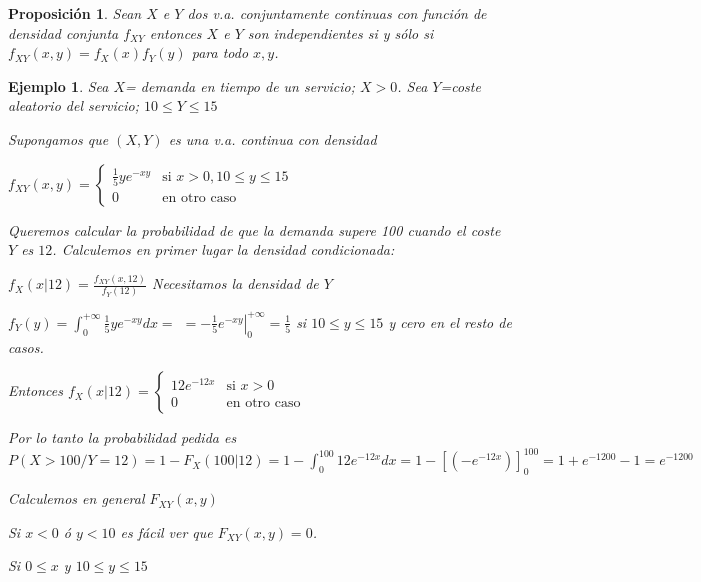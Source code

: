 \documentclass[12pt]{report}
\newtheorem{proposition}[definition]{Proposici\'on}
\newtheorem{example}[definition]{Ejemplo}
\begin{document}
    \begin{proposition}
    Sean $X$ e $Y$ dos v.a. conjuntamente continuas con función de densidad conjunta
    $f_{XY}$ entonces  $X$ e $Y$ son independientes si y sólo si $f_{X Y}(x,y)=f_{X}(x)
    f_Y(y)$ para todo $x,y$.
    \end{proposition}




\begin{example}

    Sea $X$= demanda en tiempo de un servicio; $X>0$. Sea $Y$=coste aleatorio
    del servicio; $10\leq Y\leq 15$

    Supongamos que $(X,Y)$ es una v.a. continua con densidad

    $f_{XY}(x,y)=\left\{\begin{array}{ll} \frac{1}{5} y e^{-xy} &
    \mbox{si } x>0, 10\leq y\leq 15\\
    0 & \mbox{en otro caso}\end{array}\right.$

    Queremos calcular la probabilidad de que la demanda supere 100
     cuando el coste $Y$ es $12$.
    Calculemos en primer lugar la densidad condicionada:

    $f_{X}(x|12)=\frac{f_{XY}(x,12)}{f_{Y}(12)}$
    Necesitamos la densidad de $Y$

    $f_{Y}(y)=\int_{0}^{+\infty} \frac{1}{5} y e^{-xy}
    dx=$\newline
$=\left.-\frac{1}{5}e^{-xy}\right|_{0}^{+\infty}=\frac{1}{5}$
    si $10\leq y\leq 15$ y cero en el resto de casos.

    Entonces $f_{X}(x|12)=\left\{\begin{array}{ll} 12 e^{-12x} &
    \mbox{si } x>0\\
    0 & \mbox{en otro caso}\end{array}\right.$

    Por lo tanto la probabilidad pedida es \newline
    $P(X>100/Y=12)=1-F_{X}(100|12)=
    1-\int_{0}^{100} 12 e^{-12x} dx =1- \left[(-e^{-12
    x})\right]_{0}^{100}=1+e^{-1200}-1= e^{-1200}$

    Calculemos en general $F_{XY}(x,y)$

    Si $x<0$ ó $y<10$ es fácil ver que
    $F_{XY}(x,y)=0$.

    Si $0\leq x$ y $10\leq y\leq15$


\end{example}
\end{document}
